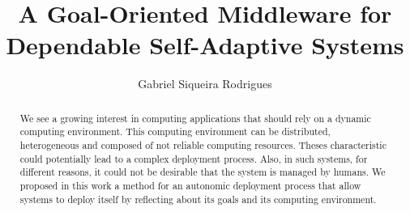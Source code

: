 \documentclass[mestrado]{pacotes/unb-cic}
\author{Gabriel Siqueira Rodrigues}
\title{A Goal-Oriented Middleware for Dependable Self-Adaptive Systems}
\begin{document}

\pretextual


%
 \begin{abstract}\textbf{}
   We see a growing interest in computing applications that should rely on a dynamic computing environment. This computing environment can be distributed, heterogeneous and composed of not reliable computing resources.
   Theses characteristic could potentially lead to a complex deployment process. Also, in such systems, for different reasons, it could not be desirable that the system is managed by humans. We proposed in this work a method for an autonomic deployment process that allow systems to deploy itself by reflecting about its goals and its computing environment.


\end{abstract}
\end{document}
